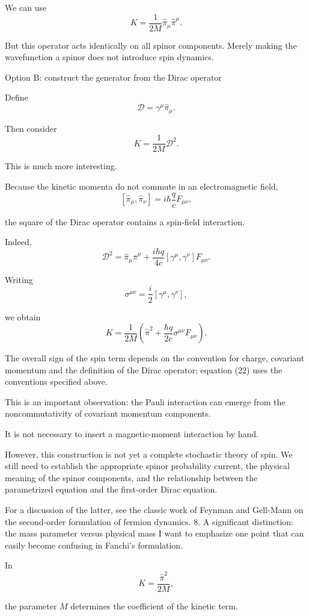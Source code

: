 We can use
\[
K=\frac{1}{2M}\hat\pi_\mu\hat\pi^\mu.
\]

But this operator acts identically on all spinor components. Merely making the wavefunction a spinor does not introduce spin dynamics.

Option B: construct the generator from the Dirac operator

Define
\[
\mathcal D=\gamma^\mu\hat\pi_\mu.
\]

Then consider
\[
K=\frac{1}{2M}\mathcal D^2.
\tag{20}
\]

This is much more interesting.

Because the kinetic momenta do not commute in an electromagnetic field,
\[
[\hat\pi_\mu,\hat\pi_\nu]
=
i\hbar\frac qc F_{\mu\nu},
\]

the square of the Dirac operator contains a spin-field interaction.

Indeed,
\[
\mathcal D^2
=
\hat\pi_\mu\hat\pi^\mu
+
\frac{i\hbar q}{4c}
[\gamma^\mu,\gamma^\nu]F_{\mu\nu}.
\tag{21}
\]

Writing
\[
\sigma^{\mu\nu}
=
\frac{i}{2}[\gamma^\mu,\gamma^\nu],
\]

we obtain
\[
\boxed{
K=
\frac{1}{2M}
\left(
\hat\pi^2+
\frac{\hbar q}{2c}\sigma^{\mu\nu}F_{\mu\nu}
\right).
}
\tag{22}
\]

The overall sign of the spin term depends on the convention for charge, covariant momentum and the definition of the Dirac operator; equation (22) uses the conventions specified above.

This is an important observation: the Pauli interaction can emerge from the noncommutativity of covariant momentum components.

It is not necessary to insert a magnetic-moment interaction by hand.

However, this construction is not yet a complete stochastic theory of spin. We still need to establish the appropriate spinor probability current, the physical meaning of the spinor components, and the relationship between the parametrized equation and the first-order Dirac equation.

For a discussion of the latter, see the classic work of Feynman and Gell-Mann on the second-order formulation of fermion dynamics.
8. A significant distinction: the mass parameter versus physical mass
I want to emphasize one point that can easily become confusing in Fanchi's formulation.

In
\[
K=\frac{\hat\pi^2}{2M},
\]

the parameter \(M\) determines the coefficient of the kinetic term.

